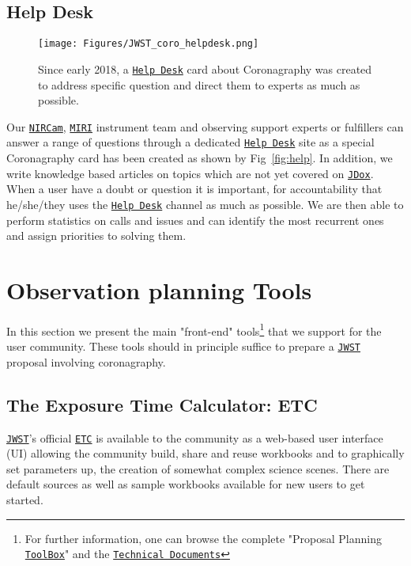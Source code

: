 \documentclass[]{spie}  %
\newcommand{\jwst}{{\tt \href{https://jwst.stsci.edu}{JWST}}\xspace}
\newcommand{\nircam}{{\tt \href{https://jwst.stsci.edu/instrumentation/nircam}{NIRCam}}\xspace}
\newcommand{\miri}{{\tt \href{https://jwst.stsci.edu/instrumentation/miri}{MIRI}}\xspace}
\newcommand{\etc}{{\tt \href{https://jwst.etc.stsci.edu/}{ETC}}\xspace}
\newcommand{\helpdesk}{{\tt \href{https://stsci.service-now.com/}{Help Desk}}\xspace}
\newcommand{\jdox}{{\tt \href{https://jwst-docs.stsci.edu/}{JDox}}\xspace}
\newcommand{\toolbox}{{\tt \href{https://jwst.stsci.edu/science-planning/proposal-planning-toolbox}{ToolBox}}\xspace}%
\newcommand{\techdoc}{{\tt \href{https://jwst.stsci.edu/documentation/technical-documents}{Technical Documents}}\xspace}%
\begin{document}
\subsection{Help Desk}
\label{sec:hd}

\begin{figure}[h!]
\begin{center}
\texttt{[image: Figures/JWST\_coro\_helpdesk.png]}
\caption{Since early 2018, a \helpdesk card about Coronagraphy was created to address specific question and direct them to experts as much as possible.}
\label{fig:jwst-help}
\end{center}
\end{figure}

Our \nircam, \miri instrument team and observing support experts or fulfillers can answer a range of questions through a dedicated \helpdesk site as a special Coronagraphy card has been created as shown by Fig~\ref{fig:help}. In addition, we write knowledge based articles on topics which are not yet covered on \jdox. When a user have a doubt or question it is important, for accountability that he/she/they uses the \helpdesk channel as much as possible. We are then able to perform statistics on calls and issues and can identify the most recurrent ones and assign priorities to solving them.

\section{Observation planning Tools}
\label{sec:tools}

In this section we present the main "front-end" tools\footnote{For further information, one can browse the complete "Proposal Planning \toolbox" and the \techdoc} that we support for the user community. These tools should in principle suffice to prepare a \jwst proposal involving coronagraphy. 

\subsection{The Exposure Time Calculator: ETC}
\label{sec:etc}

\jwst's official \etc is available to the community as a web-based user interface (UI) allowing the community build, share and reuse workbooks and to graphically set parameters up, the creation of somewhat complex science scenes. There are default sources as well as sample workbooks available for new users to get started.
\end{document}
